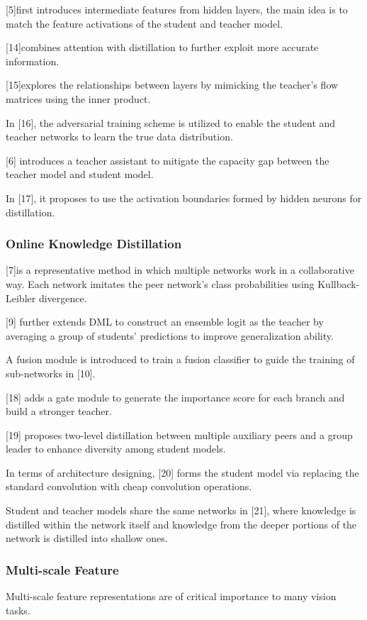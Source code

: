 \documentclass[11pt]{article}
\begin{document}
[5]first introduces intermediate features from hidden layers, the main idea is to match the feature activations of the student and teacher model. 

[14]combines attention with distillation to further exploit more accurate information. 

[15]explores the relationships between layers by mimicking the teacher’s flow matrices using the inner product. 

In [16], the adversarial training scheme is utilized to enable the student and teacher networks to learn the true data distribution. 

[6] introduces a teacher assistant to mitigate the capacity gap between the teacher model and student model. 

In [17], it proposes to use the activation boundaries formed by hidden neurons for distillation.

\subsubsection{Online Knowledge Distillation}
[7]is a representative method in which multiple networks work in a collaborative way. Each network imitates the peer network’s class probabilities using Kullback-Leibler divergence.

[9] further extends DML to construct an ensemble logit as the teacher by averaging a group of students’ predictions to improve generalization ability. 

A fusion module is introduced to train a fusion classifier to guide the training of sub-networks in [10].

[18] adds a gate module to generate the importance score for each branch and build a stronger teacher.

[19] proposes two-level distillation between multiple auxiliary peers and a
group leader to enhance diversity among student models. 

In terms of architecture designing, [20] forms the student model via replacing the standard convolution with cheap convolution operations. 

Student and teacher models share the same networks in [21], where knowledge is distilled within the network itself and knowledge from the deeper portions of the network is distilled into shallow ones.

\subsubsection{Multi-scale Feature}
Multi-scale feature representations are of critical importance to many vision tasks.
\end{document}
